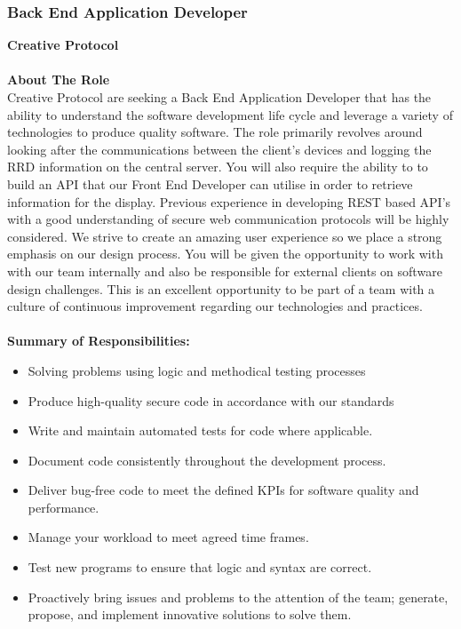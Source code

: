 \documentclass[11pt, oneside, a4paper, titlepage]{article}
\begin{document}
\subsubsection{Back End Application Developer}
\textbf{Creative Protocol }
\\
\\
\textbf{About The Role}
\\
Creative Protocol are seeking a Back End Application Developer that has the ability to understand the software development life cycle and leverage a variety of technologies to produce quality software. The role primarily revolves around looking after the communications between the client’s devices and logging the RRD information on the central server. You will also require the ability to to build an API that our Front End Developer can utilise in order to retrieve information for the display. Previous experience in developing REST based API’s with a good understanding of secure web communication protocols will be highly considered. We strive to create an amazing user experience so we place a strong emphasis on our design process. You will be given the opportunity to work with with our team internally and also be responsible for external clients on software design challenges. This is an excellent opportunity to be part of a team with a culture of continuous improvement regarding our technologies and practices. 
\\
\\
\textbf{Summary of Responsibilities:}
\begin{itemize}
	\item Solving problems using logic and methodical testing processes 
	\item Produce high-quality secure code in accordance with our standards
	\item Write and maintain automated tests for code where applicable.
	\item Document code consistently throughout the development process. 
	\item Deliver bug-free code to meet the defined KPIs for software quality and performance. 
	\item Manage your workload to meet agreed time frames. 
	\item Test new programs to ensure that logic and syntax are correct. 
	\item Proactively bring issues and problems to the attention of the team; generate, propose, and implement innovative solutions to solve them. 
\end{itemize}
\end{document}
